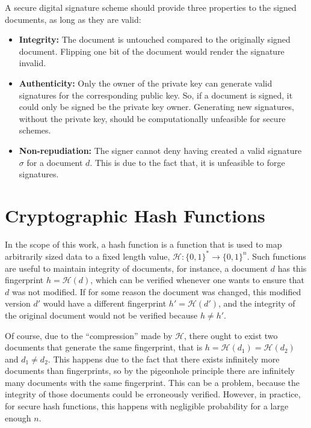 \documentclass{ufsctex/ufsctex}
\begin{document}
A secure digital signature scheme should provide three properties to the signed
documents, as long as they are valid:

\begin{itemize}

	\item \textbf{Integrity:} The document is untouched compared to the
	originally signed document. Flipping one bit of the document would render
	the signature invalid.

	\item \textbf{Authenticity:} Only the owner of the private key can generate
	valid signatures for the corresponding public key. So, if a document is
	signed, it could only be signed be the private key owner. Generating new
	signatures, without the private key, should be computationally unfeasible
	for secure schemes.

	\item \textbf{Non-repudiation:} The signer cannot deny having created a
	valid signature $\sigma$ for a document $d$. This is due to the fact that,
	it is unfeasible to forge signatures.

\end{itemize}

\section{Cryptographic Hash Functions}

In the scope of this work, a hash function is a function that is used to map
arbitrarily sized data to a fixed length value,  $\mathcal{H}:\{0,
1\}^* \rightarrow \{0, 1\}^n$. Such functions are useful to maintain integrity
of documents, for instance, a document $d$ has this fingerprint $h =
\mathcal{H}(d)$, which can be verified whenever one wants to ensure that $d$
was not modified. If for some reason the document was changed, this modified
version $d'$ would have a different fingerprint $h' = \mathcal{H}(d')$, and the
integrity of the original document would not be verified because $h \ne h'$.

Of course, due to the ``compression'' made by $\mathcal{H}$, there ought to
exist two documents that generate the same fingerprint, that is $h =
\mathcal{H}(d_1) = \mathcal{H}(d_2)$ and $d_1 \ne d_2$. This happens due to the
fact that there exists infinitely more documents than fingerprints, so by the
pigeonhole principle there are infinitely many documents with the same
fingerprint. This can be a problem, because the integrity of those documents
could be erroneously verified. However, in practice, for secure hash functions,
this happens with negligible probability for a large enough $n$.
\end{document}
